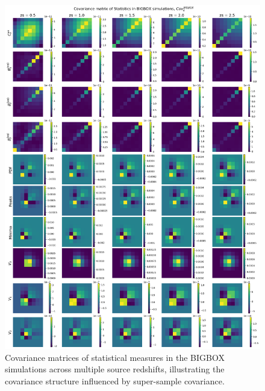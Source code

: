 \begin{figure}[p]
    \centering
    \includegraphics[width=\textwidth]{figures/results/cov_bigbox.png}
    \caption[Covariance Matrices of Statistical Measures in BIGBOX Simulations]{Covariance matrices of statistical measures in the BIGBOX simulations across multiple source redshifts, illustrating the covariance structure influenced by super-sample covariance.}
    \label{fig:cov_bigbox}
\end{figure}

